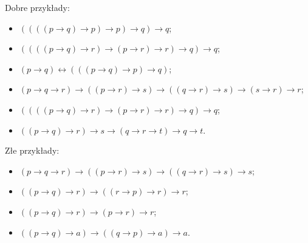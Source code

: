 \documentclass[a4paper,11pt]{article}
\newcommand\oto{\leftrightarrow}\usepackage{amssymb}
\begin{document}
\noindent Dobre przykłady:

\begin{itemize}
\item $((((p\to q)\to p)\to p)\to q)\to q$;
\item $((((p\to q)\to r)\to(p\to r)\to r)\to q)\to q$;
\item $(p\to q)\oto(((p\to q)\to p)\to q)$;
\item $(p\to q\to r)\to((p\to r)\to s)\to ((q\to r)\to s)\to (s\to r)\to r$;
\item $((((p\to q)\to r)\to (p\to r)\to r)\to q)\to q$;
\item $((p\to q)\to r)\to s\to (q\to r\to t)\to q\to t$.
\end{itemize}

\noindent  Złe przykłady:

\begin{itemize}
\item $(p\to q\to r)\to((p\to r)\to s)\to ((q\to r)\to s)\to s$;
\item $((p\to q)\to r)\to((r\to p)\to r)\to r$;
\item $((p\to q)\to r)\to (p\to r)\to r$;
\item $((p\to q)\to a)\to ((q\to p)\to a)\to a$.
\end{itemize}
\end{document}
